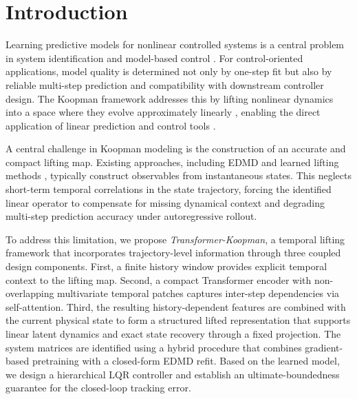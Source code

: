\documentclass[journal]{IEEEtran}
\begin{document}
\section{Introduction}
\label{sec:introduction}

Learning predictive models for nonlinear controlled systems is a central problem in system identification and model-based control \cite{ljung1999system, vanoverschee1994n4sid, nelles2020nonlinear}. For control-oriented applications, model quality is determined not only by one-step fit but also by reliable multi-step prediction and compatibility with downstream controller design. The Koopman framework addresses this by lifting nonlinear dynamics into a space where they evolve approximately linearly \cite{koopman1931hamiltonian, brunton2022modern}, enabling the direct application of linear prediction and control tools \cite{otto2021koopman, korda2018linear}.

A central challenge in Koopman modeling is the construction of an accurate and compact lifting map. Existing approaches, including EDMD \cite{williams2015data} and learned lifting methods \cite{lusch2018deep, takeishi2017koopman}, typically construct observables from instantaneous states. This neglects short-term temporal correlations in the state trajectory, forcing the identified linear operator to compensate for missing dynamical context and degrading multi-step prediction accuracy under autoregressive rollout.

To address this limitation, we propose \emph{Transformer-Koopman}, a temporal lifting framework that incorporates trajectory-level information through three coupled design components. First, a finite history window provides explicit temporal context to the lifting map. Second, a compact Transformer encoder with non-overlapping multivariate temporal patches captures inter-step dependencies via self-attention. Third, the resulting history-dependent features are combined with the current physical state to form a structured lifted representation that supports linear latent dynamics and exact state recovery through a fixed projection. The system matrices are identified using a hybrid procedure that combines gradient-based pretraining with a closed-form EDMD refit. Based on the learned model, we design a hierarchical LQR controller and establish an ultimate-boundedness guarantee for the closed-loop tracking error.
\end{document}
